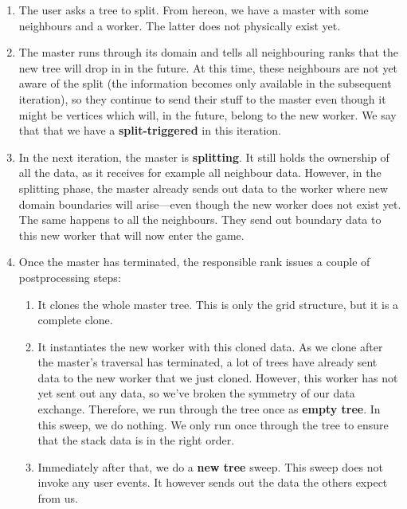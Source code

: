 \begin{enumerate}
  \item The user asks a tree to split. From hereon, we have a master with some
  neighbours and a worker. The latter does not physically exist yet.
  \item The master runs through its domain and tells all neighbouring ranks that
  the new tree will drop in in the future. At this time, these neighbours are
  not yet aware of the split (the information becomes only available in the
  subsequent iteration), so they continue to send their stuff to the master even
  though it might be vertices which will, in the future, belong to the new
  worker. We say that that we have a {\bf split-triggered} in this iteration.
  \item In the next iteration, the master is {\bf splitting}. It still holds the
  ownership of all the data, as it receives for example all neighbour data.
  However, in the splitting phase, the master already sends out data to the
  worker where new domain boundaries will arise---even though the new worker
  does not exist yet. The same happens to all the neighbours. They send out
  boundary data to this new worker that will now enter the game.
  \item Once the master has terminated, the responsible rank issues a couple of
  postprocessing steps:
  \begin{enumerate}
    \item It clones the whole master tree. This is only the grid structure, but
    it is a complete clone.
    \item It instantiates the new worker with this cloned data. As we clone
    after the master's traversal has terminated, a lot of trees have already
    sent data to the new worker that we just cloned. However, this worker has
    not yet sent out any data, so we've broken the symmetry of our data
    exchange. Therefore, we run through the tree once as {\bf empty tree}. In
    this sweep, we do nothing. We only run once through the tree to ensure
    that the stack data is in the right order.
    \item Immediately after that, we do a {\bf new tree} sweep. This sweep does
    not invoke any user events. It however sends out the data the others expect
    from us.
  \end{enumerate}
\end{enumerate}


